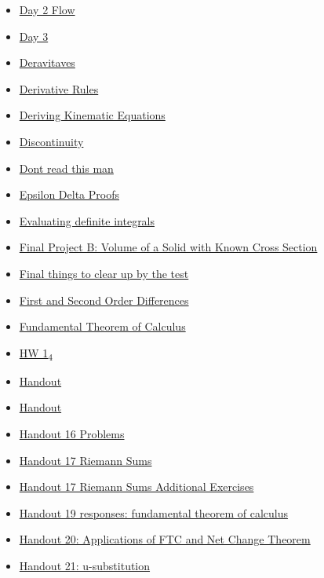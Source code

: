 \documentclass[11pt]{article}
\begin{document}
\begin{itemize}
\begin{itemize}
\item \href{math401/KBe2020math401flo2.org}{Day 2 Flow}
\item \href{math401/eFloCalcD3.org}{Day 3}
\item \href{math401/KBhMATH401Derivatives.org}{Deravitaves}
\item \href{math401/KBrefDerivativeRules.org}{Derivative Rules}
\item \href{math401/KBrefDerivingKinematicEquations.org}{Deriving Kinematic Equations}
\item \href{math401/KBhMATH401Discontinuity.org}{Discontinuity}
\item \href{math401/KBtestreflectionquestionhuxley.org}{Dont read this man}
\item \href{math401/KbhMATH401EpsilonDeltaProofs.org}{Epsilon Delta Proofs}
\item \href{math401/KBe21math401retHandout24EvaluatingDefiniteIntegrals.org}{Evaluating definite integrals}
\item \href{math401/KBe21math401retCrossSectionSolidExample.org}{Final Project B: Volume of a Solid with Known Cross Section}
\item \href{math401/KBhMATH401APCalc.org}{Final things to clear up by the test}
\item \href{math401/KBhMATH401FirstAndSecondOrder.org}{First and Second Order Differences}
\item \href{math401/KBrefFundamentalTheoremOfCalculus.org}{Fundamental Theorem of Calculus}
\item \href{math401/KBe20math401ret1\_4.org}{HW 1\textsubscript{4}}
\item \href{math401/KBdHandout4p2.org}{Handout}
\item \href{math401/KBdHandout4p1.org}{Handout}
\item \href{math401/KBe21math401retHandout16TaylorSeries.org}{Handout 16 Problems}
\item \href{math401/KBe21math401retHandout17RiemannSums.org}{Handout 17 Riemann Sums}
\item \href{math401/KBe21math401retHandout17AdditionalExercises.org}{Handout 17 Riemann Sums Additional Exercises}
\item \href{math401/KBe21math401retHandout19FundamentalTheoremCalculus.org}{Handout 19 responses: fundamental theorem of calculus}
\item \href{math401/KBe21math401retHandout20.org}{Handout 20: Applications of FTC and Net Change Theorem}
\item \href{math401/KBe21math401retHandout21uSubstitution.org}{Handout 21: u-substitution}

\end{itemize}
\end{itemize}
\end{document}
